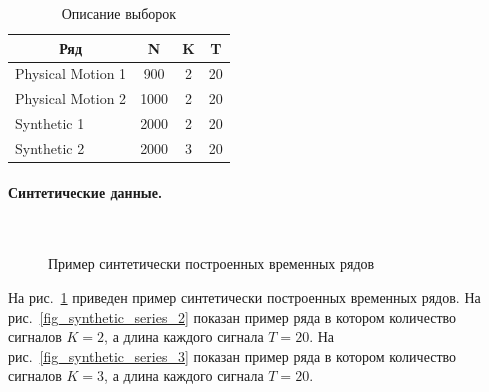 \documentclass[12pt, twoside]{article}
\begin{document}
\begin{table}[h]
\begin{center}
\caption{Описание выборок}
\begin{tabular}{|c|c|c|c|}
\hline
	Ряд &N& K& T\\
	\hline
	\multicolumn{1}{|l|}{Physical Motion 1}
	& 900& 2& 20\\
	\hline
	\multicolumn{1}{|l|}{Physical Motion 2}
	& 1000& 2& 20\\
	\hline
	\multicolumn{1}{|l|}{Synthetic 1}
	& 2000& 2& 20\\
	\hline
	\multicolumn{1}{|l|}{Synthetic 2}
	& 2000& 3& 20\\
\hline

\end{tabular}
\end{center}
\end{table}

\paragraph{Синтетические данные.}

\begin{figure}[h!t]\center
{}
\\
\caption{Пример синтетически построенных временных рядов}
\label{fig_synthetic_series}
\end{figure}

На рис.~\ref{fig_synthetic_series} приведен пример синтетически построенных временных рядов. На рис.~\ref{fig_synthetic_series_2} показан пример ряда в котором количество сигналов $K = 2$, а длина каждого сигнала $T = 20$. На рис.~\ref{fig_synthetic_series_3} показан пример ряда в котором количество сигналов $K = 3$, а длина каждого сигнала $T = 20$. 
\end{document}
